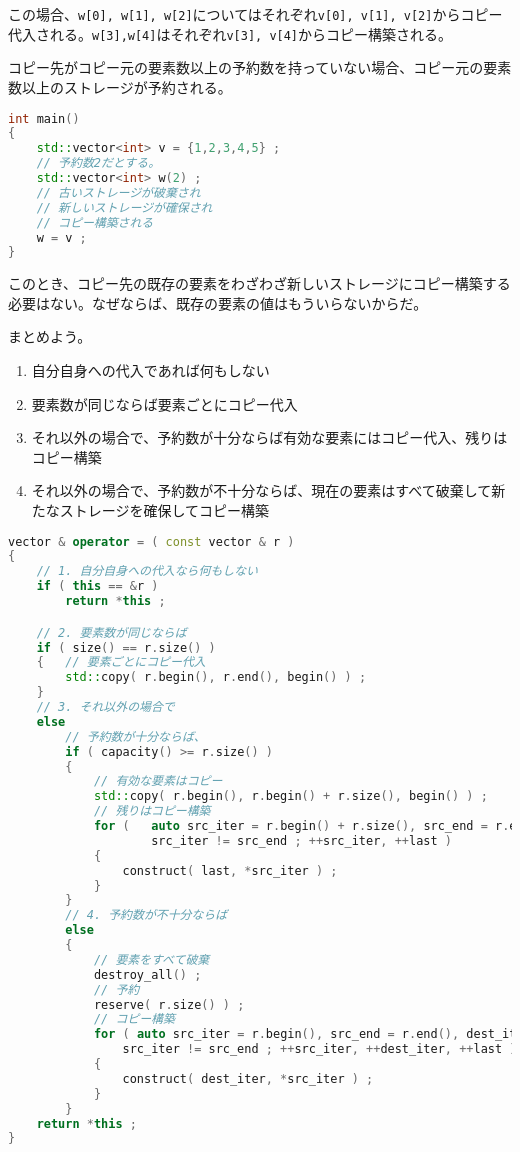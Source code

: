 この場合、\texttt{w[0], w[1], w[2]}についてはそれぞれ\texttt{v[0], v[1], v[2]}からコピー代入される。\texttt{w[3],w[4]}はそれぞれ\texttt{v[3], v[4]}からコピー構築される。

コピー先がコピー元の要素数以上の予約数を持っていない場合、コピー元の要素数以上のストレージが予約される。

\begin{lstlisting}[language={C++}]
int main()
{
    std::vector<int> v = {1,2,3,4,5} ;
    // 予約数2だとする。
    std::vector<int> w(2) ;
    // 古いストレージが破棄され
    // 新しいストレージが確保され
    // コピー構築される
    w = v ;
}
\end{lstlisting}

このとき、コピー先の既存の要素をわざわざ新しいストレージにコピー構築する必要はない。なぜならば、既存の要素の値はもういらないからだ。

まとめよう。

\begin{enumerate}
\def\labelenumi{\arabic{enumi}.}
\item
  自分自身への代入であれば何もしない
\item
  要素数が同じならば要素ごとにコピー代入
\item
  それ以外の場合で、予約数が十分ならば有効な要素にはコピー代入、残りはコピー構築
\item
  それ以外の場合で、予約数が不十分ならば、現在の要素はすべて破棄して新たなストレージを確保してコピー構築
\end{enumerate}

\begin{lstlisting}[language={C++}]
vector & operator = ( const vector & r )
{
    // 1. 自分自身への代入なら何もしない
    if ( this == &r )
        return *this ;

    // 2. 要素数が同じならば
    if ( size() == r.size() )
    {   // 要素ごとにコピー代入
        std::copy( r.begin(), r.end(), begin() ) ;
    }
    // 3. それ以外の場合で
    else 
        // 予約数が十分ならば、
        if ( capacity() >= r.size() )
        {
            // 有効な要素はコピー
            std::copy( r.begin(), r.begin() + r.size(), begin() ) ;
            // 残りはコピー構築
            for (   auto src_iter = r.begin() + r.size(), src_end = r.end() ;
                    src_iter != src_end ; ++src_iter, ++last )
            {
                construct( last, *src_iter ) ;
            }
        }
        // 4. 予約数が不十分ならば
        else
        {
            // 要素をすべて破棄
            destroy_all() ;
            // 予約
            reserve( r.size() ) ;
            // コピー構築
            for ( auto src_iter = r.begin(), src_end = r.end(), dest_iter = begin() ;
                src_iter != src_end ; ++src_iter, ++dest_iter, ++last )
            {
                construct( dest_iter, *src_iter ) ;
            }
        }
    return *this ;  
}
\end{lstlisting}

